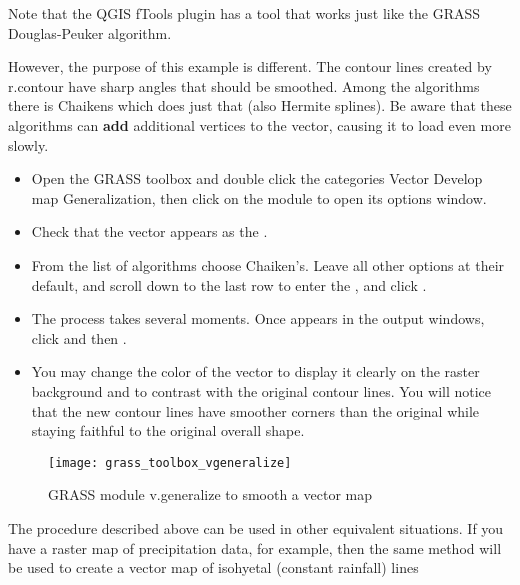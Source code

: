 \begin{Tip}\caption{\textsc{The simplify tool}}
Note that the QGIS fTools plugin has a  tool that works just like the GRASS 
Douglas-Peuker algorithm.
\end{Tip}

However, the purpose of this example is different. The contour lines created
by r.contour have sharp angles that should be smoothed. Among the
 algorithms there is Chaikens which does just that
(also Hermite splines). Be aware that these algorithms can \textbf{add}
additional vertices to the vector, causing it to load even more slowly.

\begin{itemize}[label=--]
\item Open the GRASS toolbox and double click the categories Vector \arrow
Develop map \arrow Generalization, then click on the 
module to open its options window.
\item Check that the  vector appears as the
.
\item From the list of algorithms choose Chaiken's. Leave all other options
at their default, and scroll down to the last row to enter the
, and click
.
\item The process takes several moments. Once  appears in the output windows, click  and then
.
\item You may change the color of the vector to display it clearly on the
raster background and to contrast with the original contour lines. You will
notice that the new contour lines have smoother corners than the original
while staying faithful to the original overall shape.
\end{itemize}

\begin{figure}[h]
 \centering
 \texttt{[image: grass\_toolbox\_vgeneralize]}
 \caption{GRASS module v.generalize to smooth a vector map \nixcaption}\label{fig:grass_toolbox_vgeneralize}
\end{figure}

\begin{Tip}\caption{\textsc{Other uses for r.contour}}
The procedure described above can be used in other equivalent
situations. If you have a raster map of precipitation data, for example, then
the same method will be used to create a vector map of isohyetal (constant
rainfall) lines
\end{Tip}

